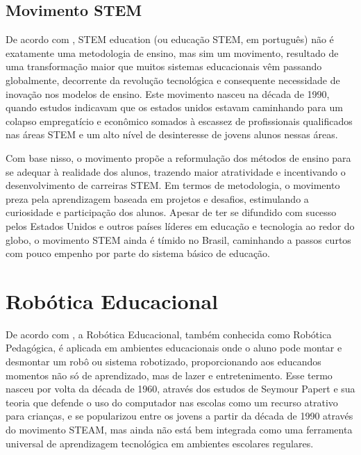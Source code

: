 \subsection{Movimento STEM}\label{sec:mov_stem}
De acordo com \cite{pugliese}, STEM education (ou educação STEM, em português) não é exatamente uma metodologia de ensino, mas sim um movimento, resultado de uma transformação maior que muitos sistemas educacionais vêm passando globalmente, decorrente da revolução tecnológica e consequente necessidade de inovação nos modelos de ensino. Este movimento nasceu na década de 1990, quando estudos indicavam que os estados unidos estavam caminhando para um colapso empregatício e econômico somados à escassez de profissionais qualificados nas áreas STEM e um alto nível de desinteresse de jovens alunos nessas áreas. 

Com base nisso, o movimento propõe a reformulação dos métodos de ensino para se adequar à realidade dos alunos, trazendo maior atratividade e incentivando o desenvolvimento de carreiras STEM. Em termos de metodologia, o movimento preza pela aprendizagem baseada em projetos e desafios, estimulando a curiosidade e participação dos alunos. Apesar de ter se difundido com sucesso pelos Estados Unidos e outros países líderes em educação e tecnologia ao redor do globo, o movimento STEM ainda é tímido no Brasil, caminhando a passos curtos com pouco empenho por parte do sistema básico de educação. 

\section{Robótica Educacional}\label{sec:robot_educ}
De  acordo com \cite{nascimento}, a Robótica Educacional, também conhecida como Robótica Pedagógica, é aplicada em ambientes educacionais onde o aluno pode montar e desmontar um robô ou sistema robotizado, proporcionando aos educandos momentos não só de aprendizado, mas de lazer e entretenimento. Esse termo nasceu por volta da década de 1960, através dos estudos de Seymour Papert e sua teoria que defende o uso do computador nas escolas como um recurso atrativo para crianças, e se popularizou entre os jovens a partir da década de 1990 através do movimento STEAM, mas ainda não está bem integrada como uma ferramenta universal de aprendizagem tecnológica em ambientes escolares regulares.
 
